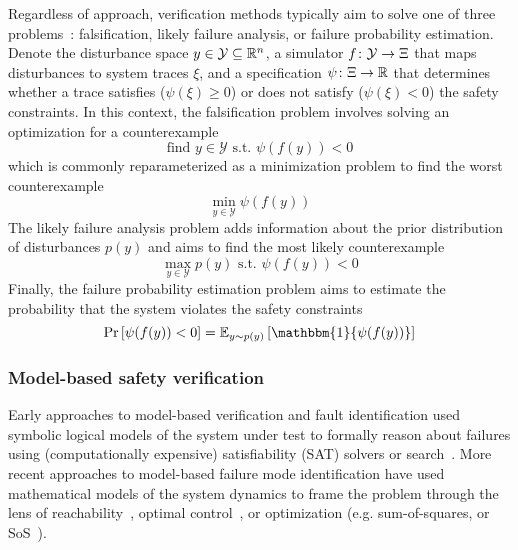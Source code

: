 Regardless of approach, verification methods typically aim to solve one of three problems~\cite{corsoSurveyAlgorithmsBlackBox2021}: falsification, likely failure analysis, or failure probability estimation. Denote the disturbance space $y \in \mathcal{Y} \subseteq \mathbb{R}^n$, a simulator $f \colon \mathcal{Y} \to \Xi$ that maps disturbances to system traces $\xi$, and a specification $\psi \colon \Xi \to \mathbb{R}$ that determines whether a trace satisfies ($\psi(\xi) \geq 0$) or does not satisfy ($\psi(\xi) < 0$) the safety constraints. In this context, the falsification problem involves solving an optimization for a counterexample
%
\begin{equation}
    \text{find } {y \in \mathcal{Y}} \text{ s.t. } \psi(f(y)) < 0
\end{equation}
%
which is commonly reparameterized as a minimization problem to find the worst counterexample
%
\begin{equation}
    \min_{y \in \mathcal{Y}} \psi(f(y))\label{ch4:eq:falsification_opt}
\end{equation}
%
The likely failure analysis problem adds information about the prior distribution of disturbances $p(y)$ and aims to find the most likely counterexample
%
\begin{equation}
    \max_{y \in \mathcal{Y}} p(y) \text{ s.t. } \psi(f(y)) < 0 \label{ch4:eq:likely_failure_opt}
\end{equation}
%
Finally, the failure probability estimation problem aims to estimate the probability that the system violates the safety constraints
%
\begin{equation}
    \Pr\left[\psi(f(y)) < 0\right] = \mathbb{E}_{y \sim p(y)}\left[\mathbbm{1}\{\psi(f(y))\} \right] \label{ch4:eq:failure_probability}
\end{equation}

\subsubsection{Model-based safety verification}





Early approaches to model-based verification and fault identification used symbolic logical models of the system under test to formally reason about failures using (computationally expensive) satisfiability (SAT) solvers or search~\cite{dekleerDiagnosingMultipleFaults1987,benardRemoteAgentExperiment2000}. More recent approaches to model-based failure mode identification have used mathematical models of the system dynamics to frame the problem through the lens of reachability~\cite{annpureddySTaLiRoToolTemporal2011,bansalHamiltonJacobiReachabilityBrief2017}, optimal control~\cite{chouUsingControlSynthesis2018}, or optimization (e.g. sum-of-squares, or SoS~\cite{ahmadiApplicationsPolynomialOptimization2016,majumdarControlVerificationHighdimensional2014}).

